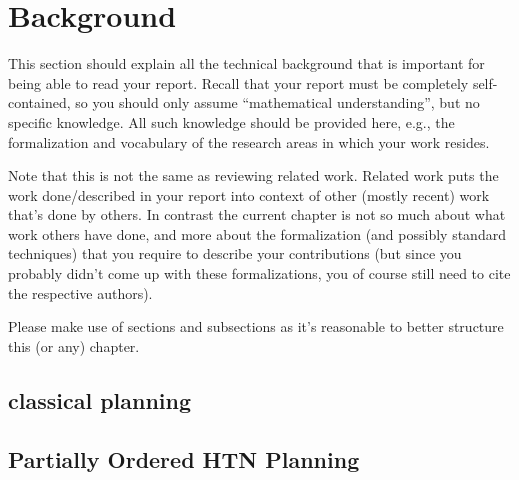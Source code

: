 \chapter{Background}\label{chap:background}

This section should explain all the technical background that is important for being able to read your report. Recall that your report must be completely self-contained, so you should only assume ``mathematical understanding'', but no specific knowledge. All such knowledge should be provided here, e.g., the formalization and vocabulary of the research areas in which your work resides.

Note that this is not the same as reviewing related work. Related work puts the work done/described in your report into context of other (mostly recent) work that's done by others. In contrast the current chapter is not so much about what work others have done, and more about the formalization (and possibly standard techniques) that you require to describe your contributions (but since you probably didn't come up with these formalizations, you of course still need to cite the respective authors).

Please make use of sections and subsections as it's reasonable to better structure this (or any) chapter.


\section{classical planning}

\section{Partially Ordered HTN Planning}